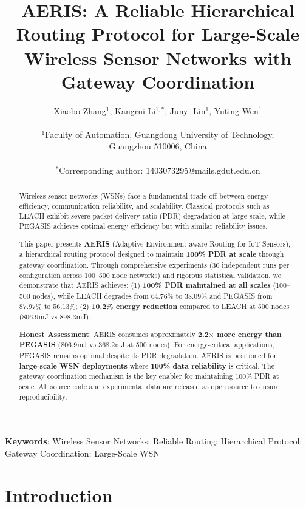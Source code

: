 \documentclass[twocolumn]{article}
\title{AERIS: A Reliable Hierarchical Routing Protocol for Large-Scale Wireless Sensor Networks with Gateway Coordination}
\author{
    Xiaobo Zhang$^{1}$,
    Kangrui Li$^{1,*}$,
    Junyi Lin$^{1}$,
    Yuting Wen$^{1}$ \\
    \\
    $^{1}$Faculty of Automation, Guangdong University of Technology, \\
    Guangzhou 510006, China \\
    \\
    $^{*}$Corresponding author: 1403073295@mails.gdut.edu.cn
}
\date{}
\begin{document}
\maketitle

\begin{abstract}
Wireless sensor networks (WSNs) face a fundamental trade-off between energy
efficiency, communication reliability, and scalability. Classical protocols
such as LEACH exhibit severe packet delivery ratio (PDR) degradation at large
scale, while PEGASIS achieves optimal energy efficiency but with similar
reliability issues.

This paper presents \textbf{AERIS} (Adaptive Environment-aware Routing for
IoT Sensors), a hierarchical routing protocol designed to maintain
\textbf{100\% PDR at scale} through gateway coordination. Through
comprehensive experiments (30 independent runs per configuration across
100--500 node networks) and rigorous statistical validation, we demonstrate
that AERIS achieves:
(1) \textbf{100\% PDR maintained at all scales} (100--500 nodes), while
LEACH degrades from 64.76\% to 38.09\% and PEGASIS from 87.97\% to 56.13\%;
(2) \textbf{10.2\% energy reduction} compared to LEACH at 500 nodes
(806.9mJ vs 898.3mJ).

\textbf{Honest Assessment}: AERIS consumes approximately \textbf{2.2$\times$
more energy than PEGASIS} (806.9mJ vs 368.2mJ at 500 nodes). For
energy-critical applications, PEGASIS remains optimal despite its PDR
degradation. AERIS is positioned for \textbf{large-scale WSN deployments}
where \textbf{100\% data reliability} is critical. The gateway coordination
mechanism is the key enabler for maintaining 100\% PDR at scale. All source
code and experimental data are released as open source to ensure reproducibility.
\end{abstract}

\textbf{Keywords}: Wireless Sensor Networks; Reliable Routing; Hierarchical
Protocol; Gateway Coordination; Large-Scale WSN

\section{Introduction}
\label{sec:introduction}
\end{document}
